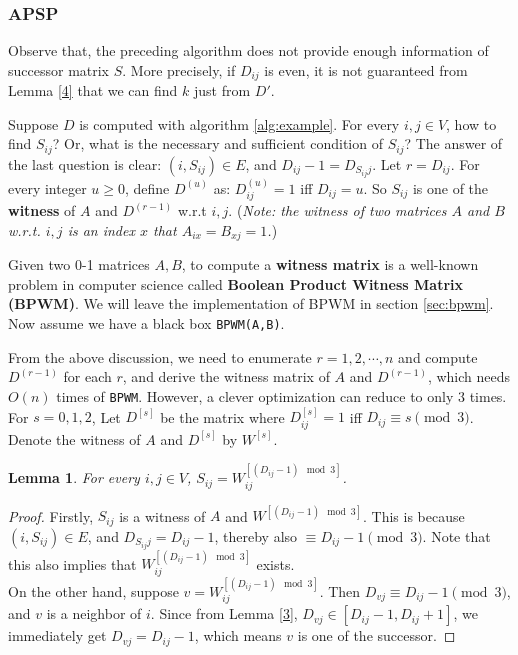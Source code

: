 \documentclass[12pt]{article}
\newtheorem{lemma}{Lemma}
\begin{document}
\subsubsection{APSP}

Observe that, the preceding algorithm does not provide enough information of successor matrix $S$. More precisely, if $D_{ij}$ is even, it is not guaranteed from Lemma \ref{4} that we can find $k$ just from $D'$.

Suppose $D$ is computed with algorithm \ref{alg:example}. For every $i,j\in V$, how to find $S_{ij}$? Or, what is the necessary and sufficient condition of $S_{ij}$? The answer of the last question is clear: $(i,S_{ij})\in E$, and $D_{ij}-1 = D_{S_{ij}j}$. Let $r=D_{ij}$. For every integer $u\ge 0$, define $D^{(u)}$ as: $D^{(u)}_{ij}=1$ iff $D_{ij}=u$. So $S_{ij}$ is one of the \textbf{witness} of $A$ and $D^{(r-1)}$ w.r.t $i,j$. (\emph{Note: the witness of two matrices $A$ and $B$ w.r.t. $i,j$ is an index $x$ that $A_{ix}=B_{xj}=1$.})

Given two 0-1 matrices $A,B$, to compute a \textbf{witness matrix} is a well-known problem in computer science called \textbf{Boolean Product Witness Matrix (BPWM)}. We will leave the implementation of BPWM in section \ref{sec:bpwm}. Now assume we have a black box \texttt{BPWM(A,B)}.

From the above discussion, we need to enumerate $r=1,2,\cdots,n$ and compute $D^{(r-1)}$ for each $r$, and derive the witness matrix of $A$ and $D^{(r-1)}$, which needs $O(n)$ times of \texttt{BPWM}. However, a clever optimization can reduce to only $3$ times. For $s=0,1,2$, Let $D^{[s]}$ be the matrix where $D^{[s]}_{ij}=1$ iff $D_{ij}\equiv s\pmod 3$. Denote the witness of $A$ and $D^{[s]}$ by $W^{[s]}$.

\begin{lemma}
\label{5}
For every $i,j\in V$, $S_{ij}=W^{[(D_{ij}-1)\mod 3]}_{ij}$.
\end{lemma}
\begin{proof}
Firstly, $S_{ij}$ is a witness of $A$ and $W^{[(D_{ij}-1)\mod 3]}$. This is because $(i,S_{ij})\in E$, and $D_{S_{ij}j}=D_{ij}-1$, thereby also $\equiv D_{ij}-1\pmod 3$. Note that this also implies that $W^{[(D_{ij}-1)\mod 3]}_{ij}$ exists.\\
On the other hand, suppose $v=W^{[(D_{ij}-1)\mod 3]}_{ij}$. Then $D_{vj}\equiv D_{ij}-1\pmod 3$, and $v$ is a neighbor of $i$. Since from Lemma \ref{3}, $D_{vj}\in [D_{ij}-1,D_{ij}+1]$, we immediately get $D_{vj}=D_{ij}-1$, which means $v$ is one of the successor.
\end{proof}
\end{document}
